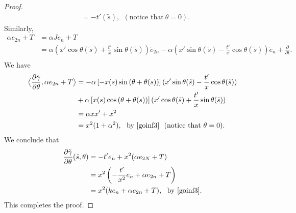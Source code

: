 \documentclass[12pt]{amsart}
\theoremstyle{definition}\newtheorem{exa}[thm]{\sc Example}
\theoremstyle{definition}\newtheorem{de}[thm]{\sc Definition}
\theoremstyle{definition}\newtheorem{rem}[thm]{\sc Remark}
\theoremstyle{definition}\newtheorem{prob}[thm]{\it Problem}
\theoremstyle{definition}\newtheorem{fact}[thm]{\sc Fact}
\theoremstyle{definition}\newtheorem{claim}[thm]{\sc Claim}
\numberwithin{equation}{section}
\begin{document}
\begin{proof}
\[\begin{split}
&=-t'(\tilde{s}),\ \ (\textrm{notice that}\ \theta=0).
\end{split}\]
Similarly, 
\[\begin{split}
\alpha e_{2n}+T&=\alpha Je_{n}+T\\
&=\alpha(x'\cos{\theta(\tilde{s})}+\frac{t'}{x}\sin{\theta(\tilde{s})})\mathring{e}_{2n}-\alpha(x'\sin{\theta(\tilde{s})}-\frac{t'}{x}\cos{\theta(\tilde{s})})\mathring{e}_{n}+\frac{\partial}{\partial t}.\\
\end{split}\]
We have
\[\begin{split}
\big<\frac{\partial\tilde{\gamma}}{\partial\theta},\alpha e_{2n}+T\big>&=-\alpha\left[-x(s)\sin{(\theta+\theta(s))}\right](x'\sin{\theta(\tilde{s})}-\frac{t'}{x}\cos{\theta(\tilde{s})})\\
&+\alpha\left[x(s)\cos{(\theta+\theta(s))}\right](x'\cos{\theta(\tilde{s})}+\frac{t'}{x}\sin{\theta(\tilde{s})})\\
&=\alpha x x'+x^{2}\\
&=x^{2}(1+\alpha^{2}),\ \ \textrm{by}\ \eqref{goinf3}\ \ (\textrm{notice that}\ \theta=0).\\
\end{split}\]
We conclude that
\[\begin{split}
\frac{\partial\tilde{\gamma}}{\partial\theta}(\tilde{s},\theta)&=-t'e_{n}+x^{2}(\alpha e_{2N}+T)\\
&=x^{2}\left(-\frac{t'}{x^{2}}e_{n}+\alpha e_{2n}+T\right)\\
&=x^{2}(ke_{n}+\alpha e_{2n}+T),\ \ \textrm{by}\ \eqref{goinf3}.
\end{split}\]
This completes the proof.
\end{proof}
\end{document}
